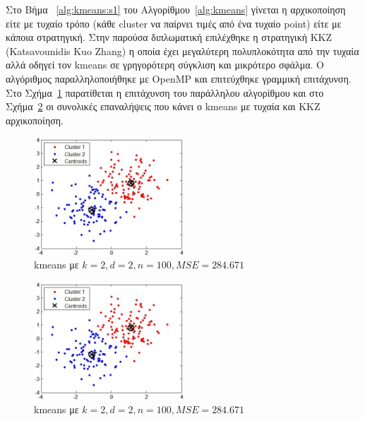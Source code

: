 \newpage

\indent Στο Βήμα ~\ref{alg:kmeans:s1} του Αλγορίθμου~\ref{alg:kmeans} γίνεται η αρχικοποίηση είτε με τυχαίο τρόπο (κάθε cluster να παίρνει τιμές από ένα τυχαίο point) είτε με κάποια στρατηγική. Στην παρούσα διπλωματική επιλέχθηκε η στρατηγική KKZ (Katsavounidis Kuo Zhang) η οποία έχει μεγαλύτερη πολυπλοκότητα από την τυχαία αλλά οδηγεί τον kmeans σε γρηγορότερη σύγκλιση και μικρότερο σφάλμα. Ο αλγόριθμος παραλληλοποιήθηκε με OpenMP και επιτεύχθηκε γραμμική επιτάχυνση. Στο Σχήμα~\ref{fig:kkzspeed} παρατίθεται η επιτάχυνση του παράλληλου αλγορίθμου και στο Σχήμα~\ref{fig:kkziter} οι συνολικές επαναλήψεις που κάνει ο kmeans με τυχαία και KKZ αρχικοποίηση.

\begin{figure}[ht]
  \centering
  \includegraphics[width=0.5\textwidth]{chapter3/kmeans.jpg}
  \caption{kmeans με $k=2,d=2,n=100,MSE=284.671$}
  \label{fig:kkzspeed}
\end{figure}

\begin{figure}[ht]
  \centering
  \includegraphics[width=0.5\textwidth]{chapter3/kmeans.jpg}
  \caption{kmeans με $k=2,d=2,n=100,MSE=284.671$}
  \label{fig:kkziter}
\end{figure}

